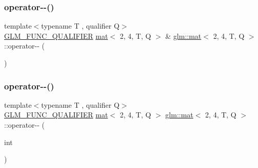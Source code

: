 \subsubsection{\texorpdfstring{operator-\/-\/()}{operator--()}\hspace{0.1cm}{\footnotesize\ttfamily [1/2]}}
{\footnotesize\ttfamily template$<$typename T , qualifier Q$>$ \\
\mbox{\hyperlink{setup_8hpp_a33fdea6f91c5f834105f7415e2a64407}{G\+L\+M\+\_\+\+F\+U\+N\+C\+\_\+\+Q\+U\+A\+L\+I\+F\+I\+ER}} \mbox{\hyperlink{structglm_1_1mat}{mat}}$<$ 2, 4, T, Q $>$ \& \mbox{\hyperlink{structglm_1_1mat}{glm\+::mat}}$<$ 2, 4, T, Q $>$\+::operator-\/-\/ (\begin{DoxyParamCaption}{ }\end{DoxyParamCaption})}

\mbox{\label{structglm_1_1mat_3_012_00_014_00_01_t_00_01_q_01_4_a740949114d5da039edaed9052968f54b}} 
\subsubsection{\texorpdfstring{operator-\/-\/()}{operator--()}\hspace{0.1cm}{\footnotesize\ttfamily [2/2]}}
{\footnotesize\ttfamily template$<$typename T , qualifier Q$>$ \\
\mbox{\hyperlink{setup_8hpp_a33fdea6f91c5f834105f7415e2a64407}{G\+L\+M\+\_\+\+F\+U\+N\+C\+\_\+\+Q\+U\+A\+L\+I\+F\+I\+ER}} \mbox{\hyperlink{structglm_1_1mat}{mat}}$<$ 2, 4, T, Q $>$ \mbox{\hyperlink{structglm_1_1mat}{glm\+::mat}}$<$ 2, 4, T, Q $>$\+::operator-\/-\/ (\begin{DoxyParamCaption}\item[{int}]{ }\end{DoxyParamCaption})}

\mbox{\label{structglm_1_1mat_3_012_00_014_00_01_t_00_01_q_01_4_ac74de81b921e4090b67c3717d9144308}} 
